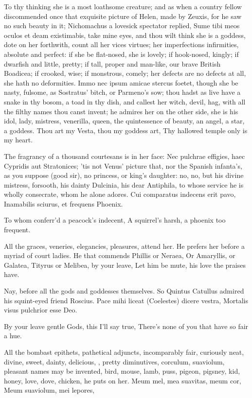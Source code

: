 {To thy thinking she is a most loathsome creature; and as when a country
fellow discommended once that exquisite picture of Helen, made by
Zeuxis, for he saw no such beauty in it; Nichomachus a lovesick
spectator replied, Sume tibi meos oculos et deam existimabis, take mine
eyes, and thou wilt think she is a goddess, dote on her forthwith,
count all her vices virtues; her imperfections infirmities, absolute
and perfect: if she be flat-nosed, she is lovely; if hook-nosed,
kingly; if dwarfish and little, pretty; if tall, proper and man-like,
our brave British Boadicea; if crooked, wise; if monstrous, comely; her
defects are no defects at all, she hath no deformities. Immo nec ipsum
amicae stercus foetet, though she be nasty, fulsome, as Sostratus'
bitch, or Parmeno's sow; thou hadst as live have a snake in thy bosom,
a toad in thy dish, and callest her witch, devil, hag, with all the
filthy names thou canst invent; he admires her on the other side, she
is his idol, lady, mistress, venerilla, queen, the quintessence
of beauty, an angel, a star, a goddess.
Thou art my Vesta, thou my goddess art,
Thy hallowed temple only is my heart.

The fragrancy of a thousand courtesans is in her face: Nec
pulchrae effigies, haec Cypridis aut Stratonices; 'tis not Venus'
picture that, nor the Spanish infanta's, as you suppose (good sir), no
princess, or king's daughter: no, no, but his divine mistress,
forsooth, his dainty Dulcinia, his dear Antiphila, to whose service he
is wholly consecrate, whom he alone adores.
Cui comparatus indecens erit pavo,
Inamabilis sciurus, et frequens Phoenix.

To whom conferr'd a peacock's indecent,
A squirrel's harsh, a phoenix too frequent.

All the graces, veneries, elegancies, pleasures, attend her. He prefers
her before a myriad of court ladies.
He that commends Phillis or Neraea,
Or Amaryllis, or Galatea,
Tityrus or Melibea, by your leave,
Let him be mute, his love the praises have.

Nay, before all the gods and goddesses themselves. So Quintus
Catullus admired his squint-eyed friend Roscius.
Pace mihi liceat (Coelestes) dicere vestra,
Mortalis visus pulchrior esse Deo.

By your leave gentle Gods, this I'll say true,
There's none of you that have so fair a hue.

All the bombast epithets, pathetical adjuncts, incomparably fair,
curiously neat, divine, sweet, dainty, delicious, \etc{}, pretty
diminutives, corculum, suaviolum, \etc{} pleasant names may be invented,
bird, mouse, lamb, puss, pigeon, pigsney, kid, honey, love, dove,
chicken, \etc{} he puts on her.
Meum mel, mea suavitas, meum cor,
Meum suaviolum, mei lepores,

}
